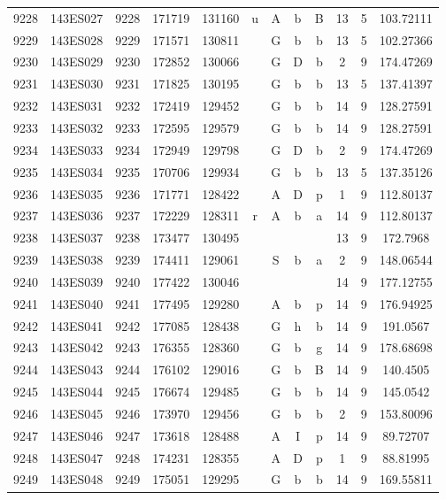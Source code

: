 \begin{tabular}{|*{12}{c|}}
9228 & 143ES027 & 9228 & 171719 & 131160 & u & A & b & B & 13 & 5 & 103.72111 \\ 
9229 & 143ES028 & 9229 & 171571 & 130811 &  & G & b & b & 13 & 5 & 102.27366 \\ 
9230 & 143ES029 & 9230 & 172852 & 130066 &  & G & D & b & 2 & 9 & 174.47269 \\ 
9231 & 143ES030 & 9231 & 171825 & 130195 &  & G & b & b & 13 & 5 & 137.41397 \\ 
9232 & 143ES031 & 9232 & 172419 & 129452 &  & G & b & b & 14 & 9 & 128.27591 \\ 
9233 & 143ES032 & 9233 & 172595 & 129579 &  & G & b & b & 14 & 9 & 128.27591 \\ 
9234 & 143ES033 & 9234 & 172949 & 129798 &  & G & D & b & 2 & 9 & 174.47269 \\ 
9235 & 143ES034 & 9235 & 170706 & 129934 &  & G & b & b & 13 & 5 & 137.35126 \\ 
9236 & 143ES035 & 9236 & 171771 & 128422 &  & A & D & p & 1 & 9 & 112.80137 \\ 
9237 & 143ES036 & 9237 & 172229 & 128311 & r & A & b & a & 14 & 9 & 112.80137 \\ 
9238 & 143ES037 & 9238 & 173477 & 130495 &  &  &  &  & 13 & 9 & 172.7968 \\ 
9239 & 143ES038 & 9239 & 174411 & 129061 &  & S & b & a & 2 & 9 & 148.06544 \\ 
9240 & 143ES039 & 9240 & 177422 & 130046 &  &  &  &  & 14 & 9 & 177.12755 \\ 
9241 & 143ES040 & 9241 & 177495 & 129280 &  & A & b & p & 14 & 9 & 176.94925 \\ 
9242 & 143ES041 & 9242 & 177085 & 128438 &  & G & h & b & 14 & 9 & 191.0567 \\ 
9243 & 143ES042 & 9243 & 176355 & 128360 &  & G & b & g & 14 & 9 & 178.68698 \\ 
9244 & 143ES043 & 9244 & 176102 & 129016 &  & G & b & B & 14 & 9 & 140.4505 \\ 
9245 & 143ES044 & 9245 & 176674 & 129485 &  & G & b & b & 14 & 9 & 145.0542 \\ 
9246 & 143ES045 & 9246 & 173970 & 129456 &  & G & b & b & 2 & 9 & 153.80096 \\ 
9247 & 143ES046 & 9247 & 173618 & 128488 &  & A & I & p & 14 & 9 & 89.72707 \\ 
9248 & 143ES047 & 9248 & 174231 & 128355 &  & A & D & p & 1 & 9 & 88.81995 \\ 
9249 & 143ES048 & 9249 & 175051 & 129295 &  & G & b & b & 14 & 9 & 169.55811 \\ 

\end{tabular}

